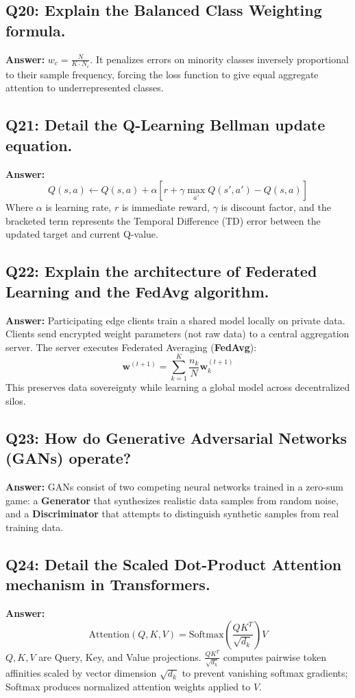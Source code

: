 \subsection*{Q20: Explain the Balanced Class Weighting formula.}
\textbf{Answer:} $w_c = \frac{N}{K \cdot N_c}$. It penalizes errors on minority classes inversely proportional to their sample frequency, forcing the loss function to give equal aggregate attention to underrepresented classes.

\subsection*{Q21: Detail the Q-Learning Bellman update equation.}
\textbf{Answer:}
\[
Q(s, a) \leftarrow Q(s, a) + \alpha \left[ r + \gamma \max_{a'} Q(s', a') - Q(s, a) \right]
\]
Where $\alpha$ is learning rate, $r$ is immediate reward, $\gamma$ is discount factor, and the bracketed term represents the Temporal Difference (TD) error between the updated target and current Q-value.

\subsection*{Q22: Explain the architecture of Federated Learning and the FedAvg algorithm.}
\textbf{Answer:} Participating edge clients train a shared model locally on private data. Clients send encrypted weight parameters (not raw data) to a central aggregation server. The server executes Federated Averaging (\textbf{FedAvg}):
\[
\mathbf{w}^{(t+1)} = \sum_{k=1}^K \frac{n_k}{N} \mathbf{w}_k^{(t+1)}
\]
This preserves data sovereignty while learning a global model across decentralized silos.

\subsection*{Q23: How do Generative Adversarial Networks (GANs) operate?}
\textbf{Answer:} GANs consist of two competing neural networks trained in a zero-sum game: a \textbf{Generator} that synthesizes realistic data samples from random noise, and a \textbf{Discriminator} that attempts to distinguish synthetic samples from real training data.

\subsection*{Q24: Detail the Scaled Dot-Product Attention mechanism in Transformers.}
\textbf{Answer:}
\[
\text{Attention}(Q, K, V) = \text{Softmax}\left( \frac{Q K^T}{\sqrt{d_k}} \right) V
\]
$Q, K, V$ are Query, Key, and Value projections. $\frac{Q K^T}{\sqrt{d_k}}$ computes pairwise token affinities scaled by vector dimension $\sqrt{d_k}$ to prevent vanishing softmax gradients; Softmax produces normalized attention weights applied to $V$.

